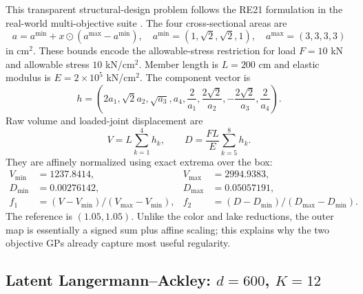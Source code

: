 \documentclass{article}
\begin{document}
This transparent structural-design problem follows the RE21 formulation in
the real-world multi-objective suite \cite{tanabe2020realworld}.  The four
cross-sectional areas are
\begin{equation}
 a=a^{\min}+x\odot(a^{\max}-a^{\min}),\quad
 a^{\min}=(1,\sqrt2,\sqrt2,1),\quad a^{\max}=(3,3,3,3)
\end{equation}
in cm$^2$.  These bounds encode the allowable-stress restriction for load
$F=10$ kN and allowable stress $10$ kN/cm$^2$.  Member length is $L=200$ cm
and elastic modulus is $E=2\times10^5$ kN/cm$^2$.  The component vector is
\begin{equation}
h=\left(2a_1,\sqrt2a_2,\sqrt{a_3},a_4,
        \frac2{a_1},\frac{2\sqrt2}{a_2},
        -\frac{2\sqrt2}{a_3},\frac2{a_4}\right).
\end{equation}
Raw volume and loaded-joint displacement are
\begin{equation}
 V=L\sum_{k=1}^4h_k,
 \qquad
 D=\frac{FL}{E}\sum_{k=5}^8h_k.
\end{equation}
They are affinely normalized using exact extrema over the box:
\begin{align}
V_{\min}&=1237.8414,& V_{\max}&=2994.9383,\\
D_{\min}&=0.00276142,& D_{\max}&=0.05057191,\\
f_1&=(V-V_{\min})/(V_{\max}-V_{\min}),&
f_2&=(D-D_{\min})/(D_{\max}-D_{\min}).
\end{align}
The reference is $(1.05,1.05)$.  Unlike the color and lake reductions, the
outer map is essentially a signed sum plus affine scaling; this explains why
the two objective GPs already capture most useful regularity.

\subsection{Latent Langermann--Ackley: $d=600$, $K=12$}
\end{document}
